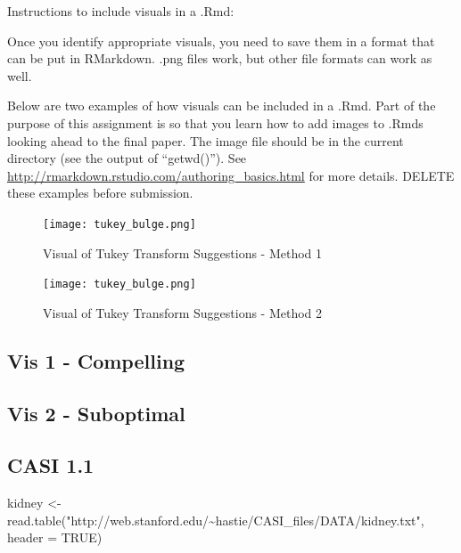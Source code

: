 \documentclass[
]{article}
\newenvironment{Shaded}{\begin{snugshade}}{\end{snugshade}}
\newcommand{\AttributeTok}[1]{\textcolor[rgb]{0.77,0.63,0.00}{#1}}
\newcommand{\ConstantTok}[1]{\textcolor[rgb]{0.00,0.00,0.00}{#1}}
\newcommand{\FunctionTok}[1]{\textcolor[rgb]{0.00,0.00,0.00}{#1}}
\newcommand{\NormalTok}[1]{#1}
\newcommand{\OtherTok}[1]{\textcolor[rgb]{0.56,0.35,0.01}{#1}}
\newcommand{\StringTok}[1]{\textcolor[rgb]{0.31,0.60,0.02}{#1}}
\begin{document}
Instructions to include visuals in a .Rmd:

Once you identify appropriate visuals, you need to save them in a format
that can be put in RMarkdown. .png files work, but other file formats
can work as well.

Below are two examples of how visuals can be included in a .Rmd. Part of
the purpose of this assignment is so that you learn how to add images to
.Rmds looking ahead to the final paper. The image file should be in the
current directory (see the output of ``getwd()''). See
\url{http://rmarkdown.rstudio.com/authoring_basics.html} for more
details. DELETE these examples before submission.

\begin{figure}
\centering
\texttt{[image: tukey\_bulge.png]}
\caption{Visual of Tukey Transform Suggestions - Method 1}
\end{figure}

\begin{figure}[htbp] 
\centering 
\texttt{[image: tukey\_bulge.png]} 
\caption{Visual of Tukey Transform Suggestions - Method 2}
\end{figure}

\hypertarget{vis-1---compelling}{%
\subsection{Vis 1 - Compelling}\label{vis-1---compelling}}

\hypertarget{vis-2---suboptimal}{%
\subsection{Vis 2 - Suboptimal}\label{vis-2---suboptimal}}

\newpage

\hypertarget{casi-1.1}{%
\subsection{CASI 1.1}\label{casi-1.1}}

\begin{Shaded}
\begin{Highlighting}[]
\NormalTok{kidney }\OtherTok{\textless{}{-}} \FunctionTok{read.table}\NormalTok{(}\StringTok{"http://web.stanford.edu/\textasciitilde{}hastie/CASI\_files/DATA/kidney.txt"}\NormalTok{, }\AttributeTok{header =} \ConstantTok{TRUE}\NormalTok{)}
\end{Highlighting}
\end{Shaded}
\end{document}
